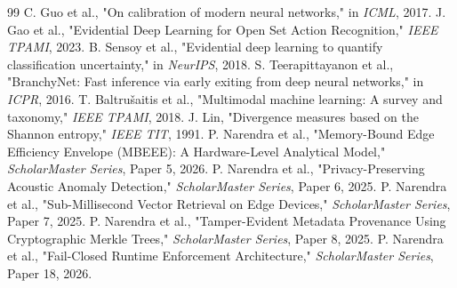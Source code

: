 \documentclass[conference]{IEEEtran}
\begin{document}
\begin{thebibliography}{99}
 C. Guo et al., "On calibration of modern neural networks," in \textit{ICML}, 2017.
 J. Gao et al., "Evidential Deep Learning for Open Set Action Recognition," \textit{IEEE TPAMI}, 2023.
 B. Sensoy et al., "Evidential deep learning to quantify classification uncertainty," in \textit{NeurIPS}, 2018.
 S. Teerapittayanon et al., "BranchyNet: Fast inference via early exiting from deep neural networks," in \textit{ICPR}, 2016.
 T. Baltrušaitis et al., "Multimodal machine learning: A survey and taxonomy," \textit{IEEE TPAMI}, 2018.
 J. Lin, "Divergence measures based on the Shannon entropy," \textit{IEEE TIT}, 1991.
 P. Narendra et al., "Memory-Bound Edge Efficiency Envelope (MBEEE): A Hardware-Level Analytical Model," \textit{ScholarMaster Series}, Paper 5, 2026.
 P. Narendra et al., "Privacy-Preserving Acoustic Anomaly Detection," \textit{ScholarMaster Series}, Paper 6, 2025.
 P. Narendra et al., "Sub-Millisecond Vector Retrieval on Edge Devices," \textit{ScholarMaster Series}, Paper 7, 2025.
 P. Narendra et al., "Tamper-Evident Metadata Provenance Using Cryptographic Merkle Trees," \textit{ScholarMaster Series}, Paper 8, 2025.
 P. Narendra et al., "Fail-Closed Runtime Enforcement Architecture," \textit{ScholarMaster Series}, Paper 18, 2026.
\end{thebibliography}
\end{document}
